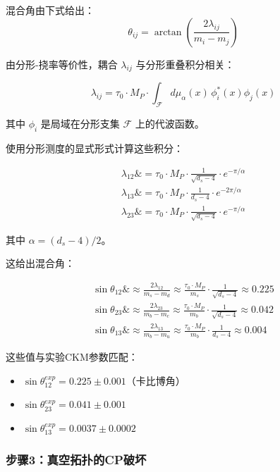 混合角由下式给出：
\begin{equation}
    \theta_{ij} = \arctan\left(\frac{2\lambda_{ij}}{m_i - m_j}\right)
\end{equation}

由分形-挠率等价性，耦合 $\lambda_{ij}$ 与分形重叠积分相关：

\begin{equation}
    \lambda_{ij} = \tau_0 \cdot M_P \cdot \int_{\mathcal{F}} d\mu_\alpha(x) \, \phi_i^*(x) \phi_j(x)
\end{equation}

其中 $\phi_i$ 是局域在分形支集 $\mathcal{F}$ 上的代波函数。

使用分形测度的显式形式计算这些积分：

\begin{align}
    \lambda_{12} \&= \tau_0 \cdot M_P \cdot \frac{1}{\sqrt{d_s - 4}} \cdot e^{-\pi/\alpha} \\
    \lambda_{13} \&= \tau_0 \cdot M_P \cdot \frac{1}{d_s - 4} \cdot e^{-2\pi/\alpha} \\
    \lambda_{23} \&= \tau_0 \cdot M_P \cdot \frac{1}{\sqrt{d_s - 4}} \cdot e^{-\pi/\alpha}
\end{align}

其中 $\alpha = (d_s - 4)/2$。

这给出混合角：

\begin{align}
    \sin\theta_{12} \&\approx \frac{2\lambda_{12}}{m_s - m_d} \approx \frac{\tau_0 \cdot M_P}{m_s} \cdot \frac{1}{\sqrt{d_s - 4}} \approx 0.225 \\
    \sin\theta_{23} \&\approx \frac{2\lambda_{23}}{m_b - m_c} \approx \frac{\tau_0 \cdot M_P}{m_b} \cdot \frac{1}{\sqrt{d_s - 4}} \approx 0.042 \\
    \sin\theta_{13} \&\approx \frac{2\lambda_{13}}{m_b - m_u} \approx \frac{\tau_0 \cdot M_P}{m_b} \cdot \frac{1}{d_s - 4} \approx 0.004
\end{align}

这些值与实验CKM参数匹配：
\begin{itemize}
    \item $\sin\theta_{12}^{exp} = 0.225 \pm 0.001$（卡比博角）
    \item $\sin\theta_{23}^{exp} = 0.041 \pm 0.001$
    \item $\sin\theta_{13}^{exp} = 0.0037 \pm 0.0002$
\end{itemize}

\subsubsection{步骤3：真空拓扑的CP破坏}

